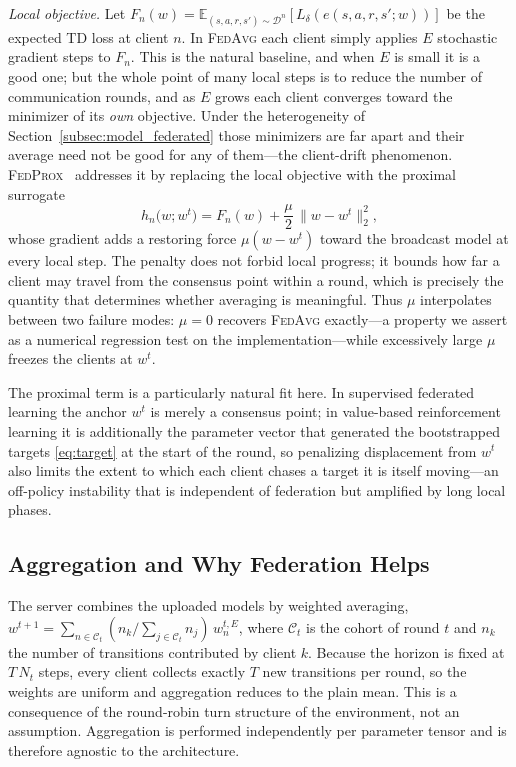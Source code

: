 \documentclass[journal]{IEEEtran}
\newcommand{\FedAvg}{\textsc{FedAvg}}
\newcommand{\FedProx}{\textsc{FedProx}}
\begin{document}
\emph{Local objective.} Let $F_{n}(w) = \mathbb{E}_{(s,a,r,s')\sim
\mathcal{D}^{n}}[L_{\delta}(e(s,a,r,s';w))]$ be the expected TD loss at client
$n$. In \FedAvg{} each client simply applies $E$ stochastic gradient steps to
$F_{n}$. This is the natural baseline, and when $E$ is small it is a good one;
but the whole point of many local steps is to reduce the number of
communication rounds, and as $E$ grows each client converges toward the
minimizer of its \emph{own} objective. Under the heterogeneity of
Section~\ref{subsec:model_federated} those minimizers are far apart and their
average need not be good for any of them---the client-drift phenomenon.
\FedProx{}~\cite{li2020fedprox} addresses it by replacing the local objective
with the proximal surrogate
\begin{equation}
h_{n}\bigl(w; w^{t}\bigr) = F_{n}(w)
  + \frac{\mu}{2}\,\bigl\lVert w - w^{t} \bigr\rVert_{2}^{2},
\label{eq:prox_local}
\end{equation}
whose gradient adds a restoring force $\mu(w-w^{t})$ toward the broadcast model
at every local step. The penalty does not forbid local progress; it bounds how
far a client may travel from the consensus point within a round, which is
precisely the quantity that determines whether averaging is meaningful. Thus
$\mu$ interpolates between two failure modes: $\mu=0$ recovers \FedAvg{}
exactly---a property we assert as a numerical regression test on the
implementation---while excessively large $\mu$ freezes the clients at $w^{t}$.

The proximal term is a particularly natural fit here. In supervised federated
learning the anchor $w^{t}$ is merely a consensus point; in value-based
reinforcement learning it is additionally the parameter vector that generated
the bootstrapped targets \eqref{eq:target} at the start of the round, so
penalizing displacement from $w^{t}$ also limits the extent to which each
client chases a target it is itself moving---an off-policy instability that is
independent of federation but amplified by long local phases.

\subsection{Aggregation and Why Federation Helps}
\label{subsec:method_agg}

The server combines the uploaded models by weighted averaging,
$w^{t+1} = \sum_{n \in \mathcal{C}_{t}} (n_{k}/\sum_{j\in\mathcal{C}_{t}}
n_{j})\, w^{t,E}_{n}$, where $\mathcal{C}_{t}$ is the cohort of round $t$ and
$n_{k}$ the number of transitions contributed by client $k$. Because the
horizon is fixed at $T\,N_{t}$ steps, every client collects exactly $T$ new
transitions per round, so the weights are uniform and aggregation reduces to
the plain mean. This is a consequence of the round-robin turn structure of the
environment, not an assumption. Aggregation is performed independently per
parameter tensor and is therefore agnostic to the architecture.
\end{document}
